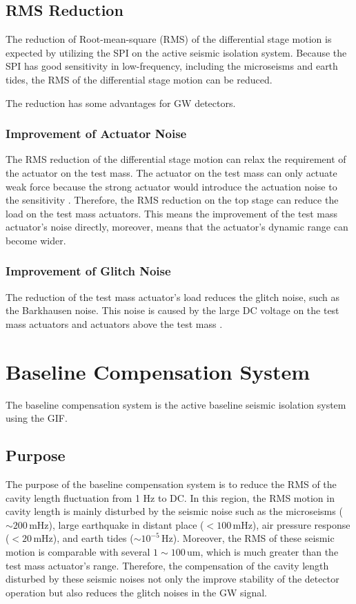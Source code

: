 \subsection{RMS Reduction}
The reduction of Root-mean-square (RMS) of the differential stage motion is expected by utilizing the SPI on the active seismic isolation system. Because the SPI has good sensitivity in low-frequency, including the microseisms and earth tides, the RMS of the differential stage motion can be reduced.

The reduction has some advantages for GW detectors.

\subsubsection{Improvement of Actuator Noise}
The RMS reduction of the differential stage motion can relax the requirement of the actuator on the test mass. The actuator on the test mass can only actuate weak force because the strong actuator would introduce the actuation noise to the sensitivity \cite{michimura2017mirror}. Therefore, the RMS reduction on the top stage can reduce the load on the test mass actuators. This means the improvement of the test mass actuator's noise directly, moreover, means that the actuator's dynamic range can become wider.

\subsubsection{Improvement of Glitch Noise}
The reduction of the test mass actuator's load reduces the glitch noise, such as the Barkhausen noise. This noise is caused by the large DC voltage on the test mass actuators and actuators above the test mass \cite{aasi2015characterization}.




\section{Baseline Compensation System}\label{sec:54}
The baseline compensation system is the active baseline seismic isolation system using the GIF. 

\subsection{Purpose}
The purpose of the baseline compensation system is to reduce the RMS of the cavity length fluctuation from 1 Hz to DC. In this region, the RMS motion in cavity length is mainly disturbed by the seismic noise such as the microseisms ($\sim 200\,\mathrm{mHz}$), large earthquake in distant place ($< 100\,\mathrm{mHz}$), air pressure response ($< 20\, \mathrm{mHz}$), and earth tides ($\sim 10^{-5}\,\mathrm{Hz}$). Moreover, the RMS of these seismic motion is comparable with several $1\sim100\,\mathrm{um}$, which is much greater than the test mass actuator's range. Therefore, the compensation of the cavity length disturbed by these seismic noises not only the improve stability of the detector operation but also reduces the glitch noises in the GW signal.


